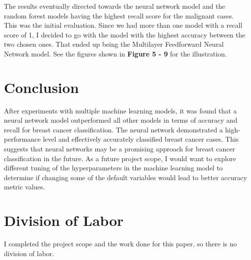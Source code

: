 \documentclass[10pt,twocolumn,letterpaper]{article}
\begin{document}
The results eventually directed towards the neural network model and the random forest models having the highest recall score for the malignant cases. This was the initial evaluation. Since we had more than one model with a recall score of 1, I decided to go with the model with the highest accuracy between the two chosen ones. That ended up being the Multilayer Feedforward Neural Network model. See the figures shown in \textbf{Figure 5 - 9} for the illustration.

\section{Conclusion}

After experiments with multiple machine learning models, it was found that a neural network model outperformed all other models in terms of accuracy and recall for breast cancer classification. The neural network demonstrated a high-performance level and effectively accurately classified breast cancer cases. This suggests that neural networks may be a promising approach for breast cancer classification in the future. As a future project scope, I would want to explore different tuning of the hyperparameters in the machine learning model to determine if changing some of the default variables would lead to better accuracy metric values.

\section{Division of Labor}

I completed the project scope and the work done for this paper, so there is no division of labor.

{\small


}
\end{document}
